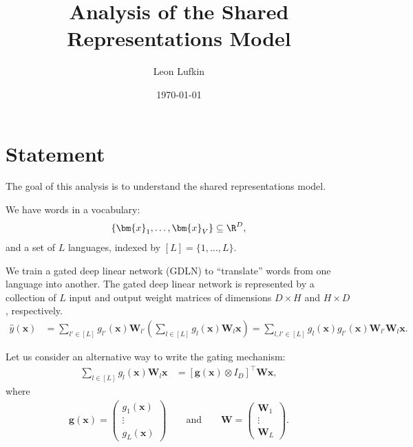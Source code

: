 \documentclass{article}
\title{Analysis of the Shared Representations Model}
\author{Leon Lufkin}
\date{\today}
\begin{document}
\section{Statement}
The goal of this analysis is to understand the shared representations model.

We have words in a vocabulary:
\begin{align*}
    \{ \bm{x}_1, \ldots, \bm{x}_V \} \subseteq \R^D,
\end{align*}
and a set of $L$ languages, indexed by $[L] = \{ 1, \ldots, L \}$.

We train a gated deep linear network (GDLN) to ``translate'' words from one language into another.
The gated deep linear network is represented by a collection of $L$ input and output weight matrices of dimensions $D \times H$ and $H \times D$, respectively.
\begin{align*}
    \hat{y}(\bm{x})
    &= \sum_{l' \in [L]} g_{l'}(\bm{x}) \bm{W}_{l'} \left( \sum_{l \in [L]} g_l(\bm{x}) \bm{W}_l \bm{x} \right) 
    = \sum_{l,l' \in [L]} g_l(\bm{x}) g_{l'}(\bm{x}) \bm{W}_{l'} \bm{W}_l \bm{x}.
\end{align*}

Let us consider an alternative way to write the gating mechanism:
\begin{align*}
    \sum_{l\in[L]} g_l(\bm{x}) \bm{W}_l \bm{x}
    &= [\bm{g}(\bm{x}) \otimes I_D]^\top \bm{W} \bm{x},
\end{align*}
where 
\begin{align*}
    \bm{g}(\bm{x}) = \begin{pmatrix} g_1(\bm{x}) \\ \vdots \\ g_L(\bm{x}) \end{pmatrix}
    \qquad \text{and} \qquad
    \bm{W} = \begin{pmatrix} \bm{W}_1 \\ \vdots \\ \bm{W}_L \end{pmatrix}.
\end{align*}
\end{document}
